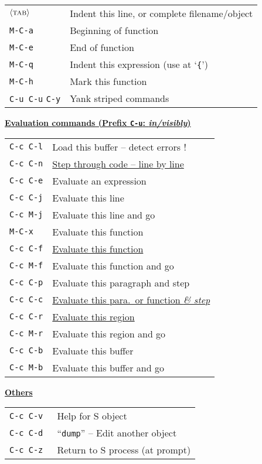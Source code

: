 \documentclass[a4paper]{article}
\newenvironment{tabI}{\begin{tabular}{p{16mm}l}}{\end{tabular}}
\newenvironment{tabTit}[1]{\underline{\textbf{#1}}\\ \begin{tabI}}{\end{tabI}}
\newcommand*{\Ecmd}[1]{$\left\langle \textrm{#1} \right\rangle$}
\newcommand*{\TAB}[0]{\Ecmd{\textsc{tab}}}
\begin{document}
\begin{multicols}{2}
\begin{tabI}
  \texttt{\TAB} & Indent this line, or complete filename/object \\
  \texttt{M-C-a} & Beginning of function \\
  \texttt{M-C-e} & End of function \\
  \texttt{M-C-q} & Indent this expression (use at `\texttt{\{}')\\
  \texttt{M-C-h} & Mark this function\\
  \texttt{\scriptsize C-u C-u} \texttt{C-y}& Yank striped commands\\
\end{tabI}

\begin{tabTit}{Evaluation commands (Prefix \texttt{C-u}: \emph{in/visibly})}
  \texttt{C-c C-l} & Load this buffer -- detect errors !\\
  \texttt{C-c C-n} & \underline{Step through code -- line by line} \\
  \texttt{C-c C-e} & Evaluate an expression \\
  \texttt{C-c C-j} & Evaluate this line \\
  \texttt{C-c M-j} & Evaluate this line and go \\
  \texttt{M-C-x}   & Evaluate this function \\
  \texttt{C-c C-f} & \underline{Evaluate this function} \\
  \texttt{C-c M-f} & Evaluate this function and go \\
  \texttt{C-c C-p} & Evaluate this paragraph and step \\
  \texttt{C-c C-c} & \underline{Evaluate this para.\ or function \emph{\& step}}\\
  \texttt{C-c C-r} & \underline{Evaluate this region} \\
  \texttt{C-c M-r} & Evaluate this region and go \\
  \texttt{C-c C-b} & Evaluate this buffer \\
  \texttt{C-c M-b} & Evaluate this buffer and go \\
\end{tabTit}

\begin{tabTit}{Others}
  \texttt{C-c C-v }& Help for S object \\
  \texttt{C-c C-d }& ``\texttt{dump}'' -- Edit another object \\
  \texttt{C-c C-z} & Return to S process (at prompt)
\end{tabTit}


\end{multicols}
\end{document}
